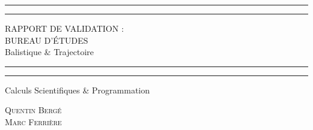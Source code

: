 \documentclass[a4paper,oneside]{article}
\begin{document}


\begin{titlepage} %

	\centering %

	\scshape %

	\vspace*{\baselineskip} %


	\rule{\textwidth}{1.6pt}\vspace*{-\baselineskip}\vspace*{2pt}
	\rule{\textwidth}{0.4pt} %

	\vspace{0.75\baselineskip} %

	{\LARGE RAPPORT DE VALIDATION :\\
	BUREAU D'\'ETUDES \\
	\vspace{0.75\baselineskip}
	Balistique \& Trajectoire} %

	\vspace{1\baselineskip} %
	\rule{\textwidth}{0.4pt}\vspace*{-\baselineskip}\vspace*{3.2pt}
	\rule{\textwidth}{1.6pt} %
	\vspace{2\baselineskip} %


	Calculs Scientifiques \& Programmation

	\vspace*{3\baselineskip} %



	\vspace{0.5\baselineskip} %

	{\scshape\Large Quentin Bergé \\ Marc Ferrière} %


\end{titlepage}
\end{document}
